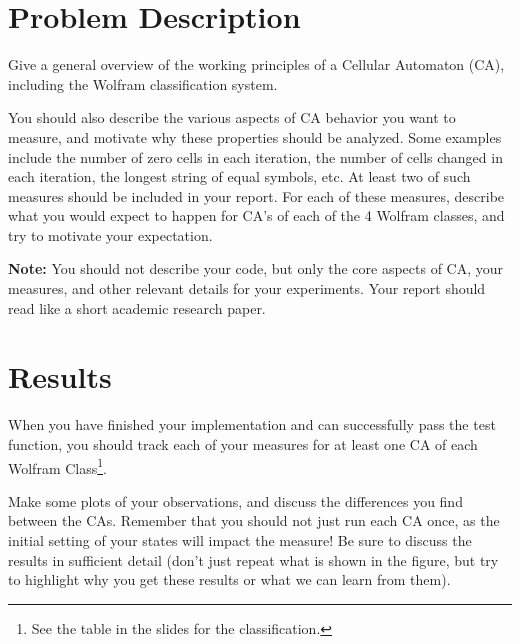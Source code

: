 \documentclass[runningheads]{llncs}
\begin{document}
\section{Problem Description}\label{sect:descr}

Give a general overview of the working principles of a Cellular Automaton (CA), including the Wolfram classification system. 

You should also describe the various aspects of CA behavior you want to measure, and motivate why these properties should be analyzed. Some examples include the number of zero cells in each iteration, the number of cells changed in each iteration, the longest string of equal symbols, etc. At least two of such measures should be included in your report. For each of these measures, describe what you would expect to happen for CA's of each of the 4 Wolfram classes, and try to motivate your expectation. 


\textbf{Note:} You should not describe your code, but only the core aspects of CA, your measures, and other relevant details for your experiments. Your report should read like a short academic research paper. 

\section{Results}
When you have finished your implementation and can successfully pass the test function, you should track each of your measures for at least one CA of each Wolfram Class\footnote{See the table in the slides for the classification.}. 

Make some plots of your observations, and discuss the differences you find between the CAs. Remember that you should not just run each CA once, as the initial setting of your states will impact the measure!  Be sure to discuss the results in sufficient detail (don't just repeat what is shown in the figure, but try to highlight why you get these results or what we can learn from them). 
\end{document}

